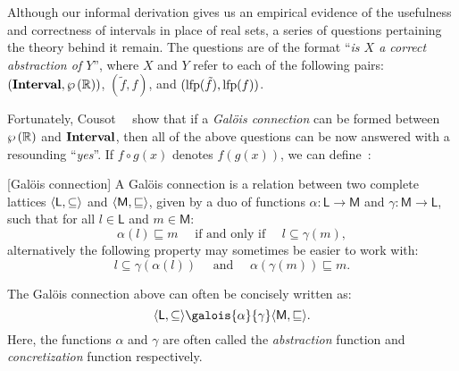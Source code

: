Although our informal derivation gives us an empirical evidence of the
usefulness and correctness of intervals in place of real sets, a series of
questions pertaining the theory behind it remain.  The questions are of the
format ``\emph{is $X$ a correct abstraction of $Y$}'', where $X$ and $Y$
refer to each of the following pairs: $(\mathbf{Interval}, \wp\left({\mathbb{R}}\right))$,
$(\tilde{f}, f)$, and $(\operatorname{\mathrm{lfp}} (\tilde{f}), \operatorname{\mathrm{lfp}} (f))$.

Fortunately, Cousot~\etal~\cite{cousot77} show that if a \emph{Gal\"ois
connection} can be formed between $\wp\left({\mathbb{R}}\right)$ and $\mathbf{Interval}$,
then all of the above questions can be now answered with a resounding
``\emph{yes}''.  If $f \circ g (x)$ denotes $f(g(x))$, we can
define~\cite{nielson99}:
\begin{definition}
    \textup{[Gal\"ois connection]}
    A Gal\"ois connection is a relation between two complete lattices
    $\langle{\mathsf{L}}, {\subseteq}\rangle$ and $\langle{\mathsf{M}}, {\sqsubseteq}\rangle$,
    given by a duo of functions $\alpha: \mathsf{L} \to \mathsf{M}$ and
    $\gamma: \mathsf{M} \to \mathsf{L}$, such that for all $l \in \mathsf{L}$
    and $m \in \mathsf{M}$:
    \begin{equation}
        \alpha (l) \sqsubseteq m
        \quad
        \text{~if and only if~}
        \quad
        l \subseteq \gamma (m),
        \label{bg:eq:galois}
    \end{equation}
    alternatively the following property may sometimes be easier to work with:
    \begin{equation}
        l \subseteq \gamma(\alpha(l))
        \quad
        \text{~and~}
        \quad
        \alpha(\gamma(m)) \sqsubseteq m.
        \label{bg:eq:galois_alt}
    \end{equation}
\end{definition}\vspace{-16.5pt}
The Gal\"ois connection above can often be concisely written as:
\begin{equation}
    \lattice{\mathsf{L}}{\subseteq}
        \galois{\alpha}{\gamma}
    \lattice{\mathsf{M}}{\sqsubseteq}.
\end{equation}
Here, the functions $\alpha$ and $\gamma$ are often called the
\emph{abstraction} function and \emph{concretization} function respectively.

